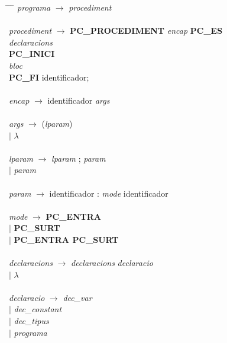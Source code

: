 
    \begin{tabbing}
    \hspace*{2.0cm} \= \hspace*{0.5cm} \= \hspace*{0.8cm} \= \kill
        \textit{programa} \> $\rightarrow $ \> \textit{procediment} \\
        \\
        \textit{procediment} \> $ \rightarrow $ \> \textbf{PC\_PROCEDIMENT} \textit{encap} \textbf{PC\_ES} \\
        \> \> \> \textit{declaracions} \\
        \> \> \textbf{PC\_INICI} \\
        \> \> \> \textit{bloc} \\
        \> \> \textbf{PC\_FI} identificador; \\
        \\
        \textit{encap} \> $ \rightarrow $ \> identificador \textit{args} \\
        \\
        \textit{args} \> $\rightarrow$ \> (\textit{lparam}) \\
        \> $ \mid $ \> $ \lambda $ \\
        \\
        \textit{lparam} \> $\rightarrow$ \> \textit{lparam} ; \textit{param} \\
        \> $\mid$ \> \textit{param} \\
        \\
        \textit{param} \> $\rightarrow$ \> identificador : \textit{mode} identificador \\
        \\
        \textit{mode} \> $\rightarrow$ \> \textbf{PC\_ENTRA} \\
        \> $\mid$ \> \textbf{PC\_SURT} \\
        \> $\mid$ \> \textbf{PC\_ENTRA PC\_SURT} \\
        \\
        \textit{declaracions} \> $\rightarrow$ \> \textit{declaracions} \textit{declaracio} \\
        \> $\mid$ \> $\lambda$ \\
        \\
        \textit{declaracio} \> $\rightarrow$ \> \textit{dec\_var} \\
        \> $\mid$ \> \textit{dec\_constant} \\
        \> $\mid$ \> \textit{dec\_tipus} \\
        \> $\mid$ \> \textit{programa} \\
        \\
        

\end{tabbing}
